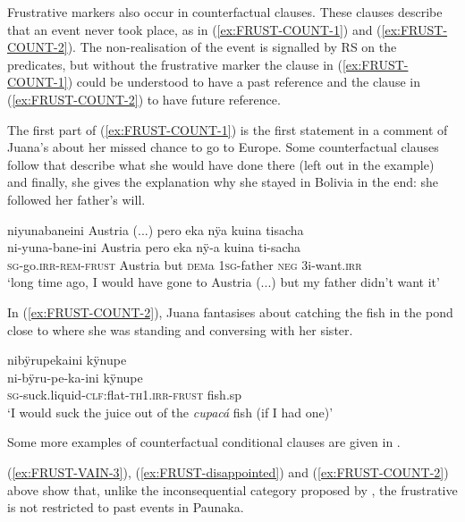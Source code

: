 Frustrative markers also occur in counterfactual clauses. These clauses describe that an event never took place, as in (\ref{ex:FRUST-COUNT-1}) and (\ref{ex:FRUST-COUNT-2}). The non-realisation of the event is signalled by  RS on the predicates, but without the frustrative marker the clause in (\ref{ex:FRUST-COUNT-1}) could be understood to have a  past reference and the clause in (\ref{ex:FRUST-COUNT-2}) to have future reference.  

The first part of (\ref{ex:FRUST-COUNT-1}) is the first statement in a comment of Juana’s about her missed chance to go to Europe. Some counterfactual clauses follow that describe what she would have done there (left out in the example) and finally, she gives the explanation why she stayed in Bolivia in the end: she followed her father’s will.

\ea\label{ex:FRUST-COUNT-1}
\begingl 
\glpreamble niyunabaneini Austria (...) pero eka nÿa kuina tisacha\\
\gla ni-yuna-bane-ini Austria pero eka nÿ-a kuina ti-sacha\\ 
\textsc{sg}-go.\textsc{irr}-\textsc{rem}-\textsc{frust} Austria but \textsc{dem}a 1\textsc{sg}-father \textsc{neg} 3i-want.\textsc{irr}\\ 
\glft ‘long time ago, I would have gone to Austria (...) but my father didn’t want it’
\xe

In (\ref{ex:FRUST-COUNT-2}), Juana fantasises about catching the fish in the pond close to where she was standing and conversing with her sister.

\ea\label{ex:FRUST-COUNT-2}
\begingl 
\glpreamble nibÿrupekaini kÿnupe\\
\gla ni-bÿru-pe-ka-ini kÿnupe\\ 
\textsc{sg}-suck.liquid-\textsc{clf}:flat-\textsc{th}1.\textsc{irr}-\textsc{frust} fish.sp\\ 
\glft ‘I would suck the juice out of the \textit{cupacá} fish (if I had one)’
\xe

Some more examples of counterfactual conditional clauses are given in .

(\ref{ex:FRUST-VAIN-3}), (\ref{ex:FRUST-disappointed}) and (\ref{ex:FRUST-COUNT-2}) above show that, unlike the inconsequential category proposed by \citet[]{Kuteva2019}, the frustrative is not restricted to past events in Paunaka.


